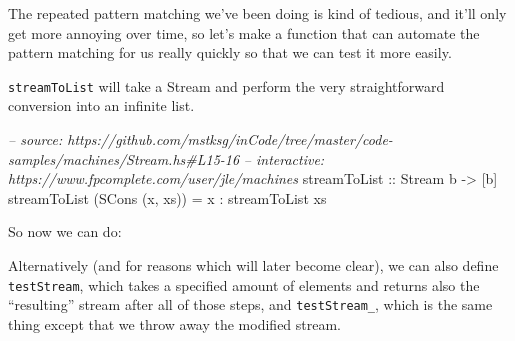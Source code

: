 \documentclass[]{article}
\newenvironment{Shaded}{}{}
\newcommand{\DataTypeTok}[1]{\textcolor[rgb]{0.56,0.13,0.00}{{#1}}}
\newcommand{\DecValTok}[1]{\textcolor[rgb]{0.25,0.63,0.44}{{#1}}}
\newcommand{\CommentTok}[1]{\textcolor[rgb]{0.38,0.63,0.69}{\textit{{#1}}}}
\newcommand{\OtherTok}[1]{\textcolor[rgb]{0.00,0.44,0.13}{{#1}}}
\newcommand{\FunctionTok}[1]{\textcolor[rgb]{0.02,0.16,0.49}{{#1}}}
\newcommand{\NormalTok}[1]{{#1}}
\begin{document}
The repeated pattern matching we've been doing is kind of tedious, and it'll
only get more annoying over time, so let's make a function that can automate the
pattern matching for us really quickly so that we can test it more easily.

\texttt{streamToList} will take a Stream and perform the very straightforward
conversion into an infinite list.

\begin{Shaded}
\begin{Highlighting}[]
\CommentTok{-- source: https://github.com/mstksg/inCode/tree/master/code-samples/machines/Stream.hs#L15-16}
\CommentTok{-- interactive: https://www.fpcomplete.com/user/jle/machines}
\OtherTok{streamToList ::} \DataTypeTok{Stream} \NormalTok{b }\OtherTok{->} \NormalTok{[b]}
\NormalTok{streamToList (}\DataTypeTok{SCons} \NormalTok{(x, xs)) }\FunctionTok{=} \NormalTok{x }\FunctionTok{:} \NormalTok{streamToList xs}
\end{Highlighting}
\end{Shaded}

So now we can do:

\begin{Shaded}
\end{Shaded}

Alternatively (and for reasons which will later become clear), we can also
define \texttt{testStream}, which takes a specified amount of elements and
returns also the ``resulting'' stream after all of those steps, and
\texttt{testStream\_}, which is the same thing except that we throw away the
modified stream.
\end{document}
